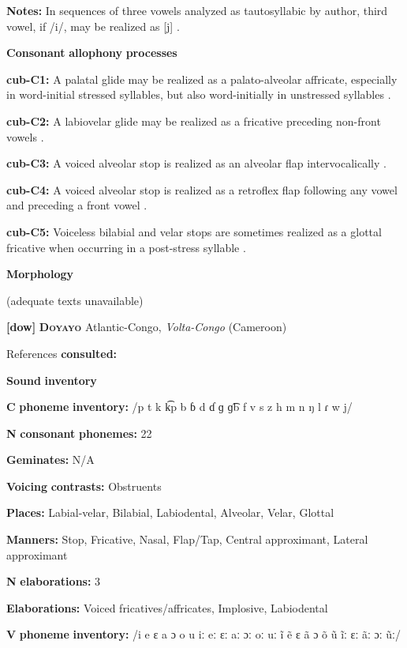 \begin{styleBody}
\textbf{Notes:} In sequences of three vowels analyzed as tautosyllabic by author, third vowel, if /i/, may be realized as [j] \citep[52]{Chacon2012}.

\textbf{Consonant} \textbf{allophony} \textbf{processes}

\textbf{cub-C1:} A palatal glide may be realized as a palato-alveolar affricate, especially in word-initial stressed syllables, but also word-initially in unstressed syllables \citep[67]{Chacon2012}.

\textbf{cub-C2:} A labiovelar glide may be realized as a fricative preceding non-front vowels \citep[63]{Chacon2012}.

\textbf{cub-C3:} A voiced alveolar stop is realized as an alveolar flap intervocalically \citep[63]{Chacon2012}.

\textbf{cub-C4:} A voiced alveolar stop is realized as a retroflex flap following any vowel and preceding a front vowel \citep[6]{Chacon2012}.

\textbf{cub-C5:} Voiceless bilabial and velar stops are sometimes realized as a glottal fricative when occurring in a post-stress syllable \citep[123]{Chacon2012}.

\textbf{Morphology}

(adequate texts unavailable)

\textbf{[dow]}   \textbf{\textsc{Doyayo}}    Atlantic-Congo, \textit{Volta-Congo} (Cameroon)

References \textbf{consulted:} \citet{WieringWiering1994}

\textbf{Sound} \textbf{inventory}

\textbf{C} \textbf{phoneme} \textbf{inventory:} /p t k k͡p b ɓ d ɗ ɡ ɡ͡b f v s z h m n ŋ l ɾ w j/

\textbf{N} \textbf{consonant} \textbf{phonemes:} 22

\textbf{Geminates:} N/A

\textbf{Voicing} \textbf{contrasts:} Obstruents

\textbf{Places:} Labial-velar, Bilabial, Labiodental, Alveolar, Velar, Glottal

\textbf{Manners:} Stop, Fricative, Nasal, Flap/Tap, Central approximant, Lateral approximant

\textbf{N} \textbf{elaborations:} 3

\textbf{Elaborations:} Voiced fricatives/affricates, Implosive, Labiodental

\textbf{V} \textbf{phoneme} \textbf{inventory:} /i e ɛ a ɔ o u iː eː ɛː aː ɔː oː uː ĩ ẽ ɛ ã ɔ õ ũ ĩː ɛː ãː ɔː ũː/


\end{styleBody}
